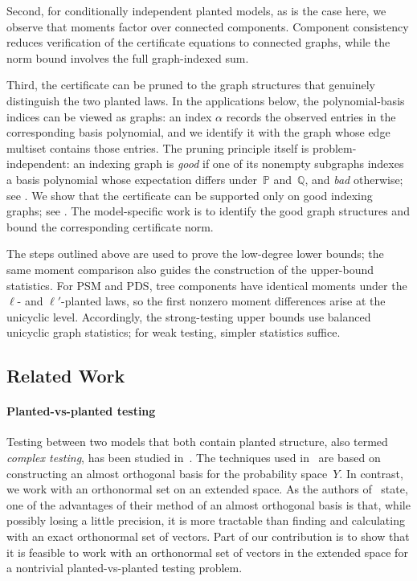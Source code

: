 \documentclass[11pt, letterpaper]{article}
\numberwithin{equation}{section}
\newcommand{\PP}{\mathbb{P}}
\newcommand{\QQ}{\mathbb{Q}}
\begin{document}
Second, for conditionally independent planted models, as is the case here, we observe that moments factor over connected components. Component consistency reduces verification of the certificate equations to connected graphs, while the norm bound involves the full graph-indexed sum.

Third, the certificate can be pruned to the graph structures that genuinely distinguish the two planted laws. In the applications below, the polynomial-basis indices can be viewed as graphs: an index $\alpha$ records the observed entries in the corresponding basis polynomial, and we identify it with the graph whose edge multiset contains those entries. The pruning principle itself is problem-independent: an indexing graph is \emph{good} if one of its nonempty subgraphs indexes a basis polynomial whose expectation differs under~$\PP$ and~$\QQ$, and \emph{bad} otherwise; see . We show that the certificate can be supported only on good indexing graphs; see . The model-specific work is to identify the good graph structures and bound the corresponding certificate norm.

The steps outlined above are used to prove the low-degree lower bounds; the same moment comparison also guides the construction of the upper-bound
statistics. For PSM and PDS, tree components have identical moments under the $\ell$- and $\ell'$-planted laws, so the first nonzero moment differences arise at the unicyclic level. Accordingly, the strong-testing upper bounds use balanced unicyclic graph statistics; for weak testing, simpler statistics suffice.



\subsection{Related Work}
\paragraph*{Planted-vs-planted testing}
Testing between two models that both contain planted structure, also termed \emph{complex testing}, has been studied in~\cite{rush2023easier,coloring-clique,fourier-geo,carpentier2025low}.
The techniques used in~\cite{carpentier2025low} are based on constructing an almost orthogonal basis for the probability space~$Y$. In contrast, we work with an orthonormal set on an extended space. As the authors of~\cite{carpentier2025low} state, one of the advantages of their method of an almost orthogonal basis is that, while possibly losing a little precision, it is more tractable than finding and calculating with an exact orthonormal set of vectors. Part of our contribution is to show that it is feasible to work with an orthonormal set of vectors in the extended space for a nontrivial planted-vs-planted testing problem.
\end{document}
